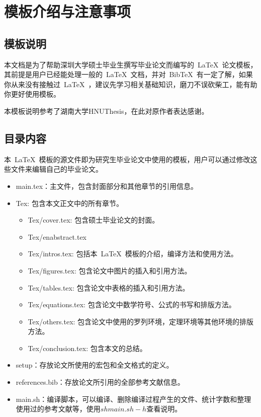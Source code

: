 
\chapter{模板介绍与注意事项}
\section{模板说明}

本文档是为了帮助深圳大学硕士毕业生撰写毕业论文而编写的~\LaTeX~论文模板，其前提是用户已经能处理一般的~\LaTeX~文档，并对~BibTeX~有一定了解，如果你从来没有接触过~\LaTeX~，建议先学习相关基础知识，磨刀不误砍柴工，能有助你更好使用模板。

本模板说明参考了湖南大学HNUThesis\cite{ljmdzyx131}，在此对原作者表达感谢。

\section{目录内容}
本~\LaTeX{}~模板的源文件即为研究生毕业论文中使用的模板，用户可以通过修改这些文件来编辑自己的毕业论文。
\begin{itemize}
\item main.tex：主文件，包含封面部分和其他章节的引用信息。
\item Tex: 包含本文正文中的所有章节。
    \begin{itemize}
            \item Tex/cover.tex: 包含硕士毕业论文的封面。
            \item Tex/enabstract.tex
            \item Tex/intros.tex: 包括本~\LaTeX~模板的介绍，编译方法和使用方法。
            \item Tex/figures.tex: 包含论文中图片的插入和引用方法。
            \item Tex/tables.tex: 包含论文中表格的插入和引用方法。
            \item Tex/equations.tex: 包含论文中数学符号、公式的书写和排版方法。
            \item Tex/others.tex: 包含论文中使用的罗列环境，定理环境等其他环境的排版方法。
            \item Tex/conclusion.tex: 包含本文的总结。
    \end{itemize}
    \item setup：存放论文所使用的宏包和全文格式的定义。
    \item references.bib：存放论文所引用的全部参考文献信息。
    \item main.sh：编译脚本，可以编译、删除编译过程产生的文件、统计字数和整理使用过的参考文献等，使用$sh main.sh -h$查看说明。
\end{itemize}

